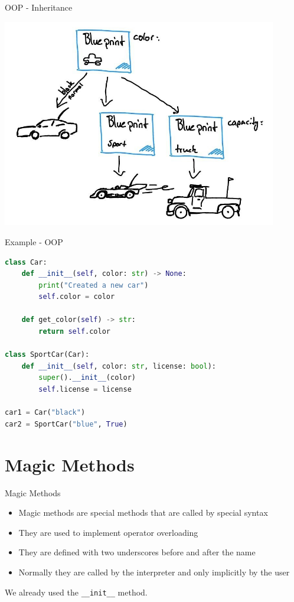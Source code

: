 \documentclass{beamer}
\begin{document}
\begin{frame}{OOP - Inheritance}
    \begin{center}
        \includegraphics[width=0.9\textwidth]{figures/full_inheritance.jpg}
    \end{center}
\end{frame}

\begin{frame}[fragile]{Example - OOP}
    \begin{lstlisting}[language=Python]
class Car:
    def __init__(self, color: str) -> None:
        print("Created a new car")
        self.color = color

    def get_color(self) -> str:
        return self.color
        
class SportCar(Car):
    def __init__(self, color: str, license: bool):
        super().__init__(color)
        self.license = license
        
car1 = Car("black")
car2 = SportCar("blue", True)
    \end{lstlisting}
\end{frame}

\section{Magic Methods}
\begin{frame}{Magic Methods}
    \begin{itemize}
        \item Magic methods are special methods that are called by special syntax
        \item They are used to implement operator overloading
        \item They are defined with two underscores before and after the name
        \item Normally they are called by the interpreter and only implicitly by the user
    \end{itemize}
    We already used the \texttt{\_\_init\_\_} method.

\end{frame}
\end{document}
